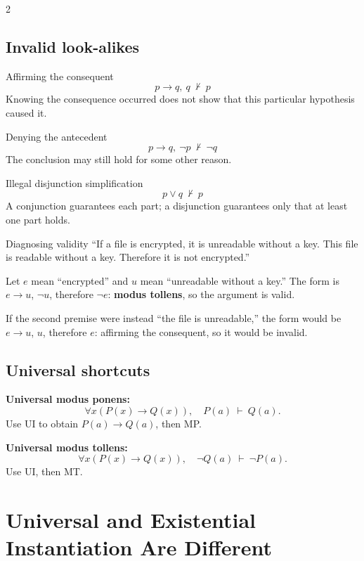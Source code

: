 \documentclass[10pt]{article}
\newcommand{\term}[1]{\textbf{\color{ProofNavy}#1}}
\begin{document}
\begin{multicols}{2}
\columnbreak
\subsection*{Invalid look-alikes}

\begin{warningbox}{Affirming the consequent}
\[
 p\to q,\ q\ \nvdash\ p
\]
Knowing the consequence occurred does not show that this particular hypothesis
caused it.
\end{warningbox}

\begin{warningbox}{Denying the antecedent}
\[
 p\to q,\ \neg p\ \nvdash\ \neg q
\]
The conclusion may still hold for some other reason.
\end{warningbox}

\begin{warningbox}{Illegal disjunction simplification}
\[
 p\lor q\ \nvdash\ p
\]
A conjunction guarantees each part; a disjunction guarantees only that at
least one part holds.
\end{warningbox}

\begin{workedbox}{Diagnosing validity}
``If a file is encrypted, it is unreadable without a key. This file is readable
without a key. Therefore it is not encrypted.''

Let $e$ mean ``encrypted'' and $u$ mean ``unreadable without a key.'' The form
is $e\to u$, $\neg u$, therefore $\neg e$: \textbf{modus tollens}, so the
argument is valid.

If the second premise were instead ``the file is unreadable,'' the form would
be $e\to u$, $u$, therefore $e$: affirming the consequent, so it would be
invalid.
\end{workedbox}

\subsection*{Universal shortcuts}
\term{Universal modus ponens:}
\[
\forall x(P(x)\to Q(x)),\quad P(a)\ \vdash\ Q(a).
\]
Use UI to obtain $P(a)\to Q(a)$, then MP.

\term{Universal modus tollens:}
\[
\forall x(P(x)\to Q(x)),\quad \neg Q(a)\ \vdash\ \neg P(a).
\]
Use UI, then MT.

\end{multicols}

\clearpage
\section*{Universal and Existential Instantiation Are Different}
\end{document}
